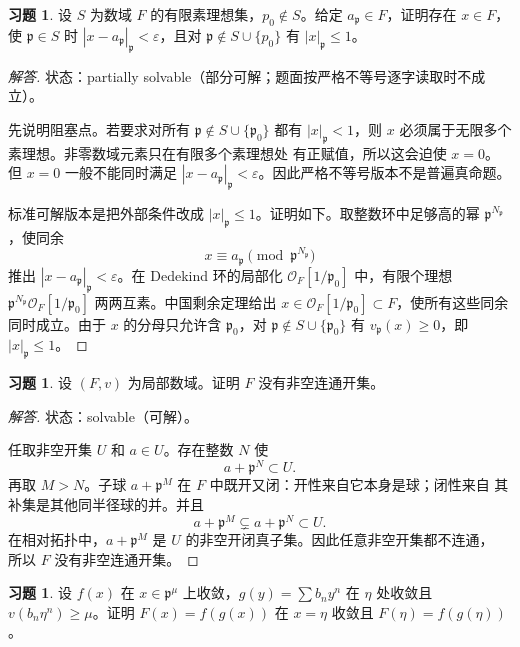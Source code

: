 \documentclass[11pt,a4paper,openany]{ctexbook}
\numberwithin{equation}{chapter}
\newcommand{\OF}{\mathcal{O}_F}
\theoremstyle{plain}
\theoremstyle{definition}
\newtheorem{exercise}[theorem]{习题}
\theoremstyle{remark}
\begin{document}
\begin{exercise}
设 $S$ 为数域 $F$ 的有限素理想集，$p_0\notin S$。给定 $a_{\mathfrak p}\in F$，证明存在 $x\in F$，使 $\mathfrak p\in S$ 时 $|x-a_{\mathfrak p}|_{\mathfrak p}<\varepsilon$，且对 $\mathfrak p\notin S\cup\{p_0\}$ 有 $|x|_{\mathfrak p}\le1$。
\end{exercise}

\begin{proof}[解答]
状态：partially solvable（部分可解；题面按严格不等号逐字读取时不成立）。

先说明阻塞点。若要求对所有 $\mathfrak p\notin S\cup\{\mathfrak p_0\}$ 都有
$|x|_{\mathfrak p}<1$，则 $x$ 必须属于无限多个素理想。非零数域元素只在有限多个素理想处
有正赋值，所以这会迫使 $x=0$。但 $x=0$ 一般不能同时满足
$|x-a_{\mathfrak p}|_{\mathfrak p}<\varepsilon$。因此严格不等号版本不是普遍真命题。

标准可解版本是把外部条件改成 $|x|_{\mathfrak p}\le1$。证明如下。取整数环中足够高的幂
$\mathfrak p^{N_{\mathfrak p}}$，使同余
\[
x\equiv a_{\mathfrak p}\pmod{\mathfrak p^{N_{\mathfrak p}}}
\]
推出 $|x-a_{\mathfrak p}|_{\mathfrak p}<\varepsilon$。在 Dedekind 环的局部化
$\OF[1/\mathfrak p_0]$ 中，有限个理想
$\mathfrak p^{N_{\mathfrak p}}\OF[1/\mathfrak p_0]$ 两两互素。中国剩余定理给出
$x\in\OF[1/\mathfrak p_0]\subset F$，使所有这些同余同时成立。由于 $x$ 的分母只允许含
$\mathfrak p_0$，对 $\mathfrak p\notin S\cup\{\mathfrak p_0\}$ 有
$v_{\mathfrak p}(x)\ge0$，即 $|x|_{\mathfrak p}\le1$。
\end{proof}

\begin{exercise}
设 $(F,v)$ 为局部数域。证明 $F$ 没有非空连通开集。
\end{exercise}

\begin{proof}[解答]
状态：solvable（可解）。

任取非空开集 $U$ 和 $a\in U$。存在整数 $N$ 使
\[
a+\mathfrak p^N\subset U.
\]
再取 $M>N$。子球 $a+\mathfrak p^M$ 在 $F$ 中既开又闭：开性来自它本身是球；闭性来自
其补集是其他同半径球的并。并且
\[
a+\mathfrak p^M\subsetneq a+\mathfrak p^N\subset U.
\]
在相对拓扑中，$a+\mathfrak p^M$ 是 $U$ 的非空开闭真子集。因此任意非空开集都不连通，
所以 $F$ 没有非空连通开集。
\end{proof}

\begin{exercise}
设 $f(x)$ 在 $x\in\mathfrak p^\mu$ 上收敛，$g(y)=\sum b_ny^n$ 在 $\eta$ 处收敛且 $v(b_n\eta^n)\ge\mu$。证明 $F(x)=f(g(x))$ 在 $x=\eta$ 收敛且 $F(\eta)=f(g(\eta))$。
\end{exercise}
\end{document}
